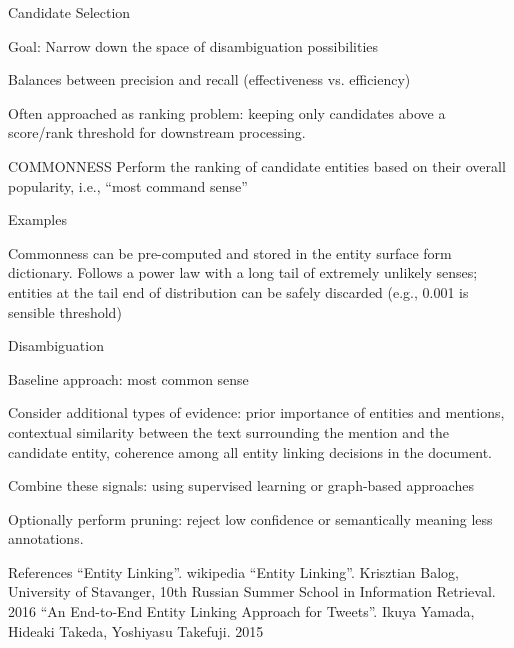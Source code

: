 Candidate Selection


Goal: Narrow down the space of disambiguation possibilities

Balances between precision and recall (effectiveness vs. efficiency)

Often approached as ranking problem: keeping only candidates above a score/rank threshold for downstream processing.

COMMONNESS
Perform the ranking of candidate entities based on their overall popularity, i.e., “most command sense”



Examples



Commonness can be pre-computed and stored in the entity surface form dictionary. Follows a power law with a long tail of extremely unlikely senses; entities at the tail end of distribution can be safely discarded (e.g., 0.001 is sensible threshold)



Disambiguation


Baseline approach: most common sense

Consider additional types of evidence: prior importance of entities and mentions, contextual similarity between the text surrounding the mention and the candidate entity, coherence among all entity linking decisions in the document.

Combine these signals: using supervised learning or graph-based approaches

Optionally perform pruning: reject low confidence or semantically meaning less annotations.

References
“Entity Linking”. wikipedia
“Entity Linking”. Krisztian Balog, University of Stavanger, 10th Russian Summer School in Information Retrieval. 2016
“An End-to-End Entity Linking Approach for Tweets”. Ikuya Yamada, Hideaki Takeda, Yoshiyasu Takefuji. 2015